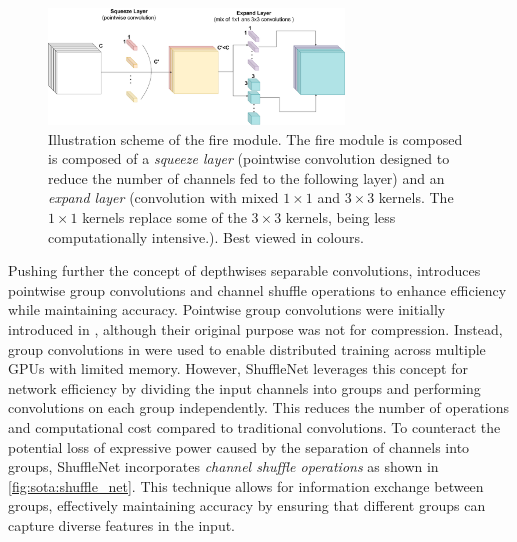 \begin{figure}[htbp]
    \centering
    \includegraphics[width=0.70\textwidth]{chapter_sota/assets/fire_module.pdf}
    \caption{Illustration scheme of the fire module. The fire module is composed
    is composed of a \emph{squeeze layer} (pointwise convolution designed to
    reduce the number of channels fed to the following layer) and an
    \emph{expand layer} (convolution with mixed $1\times1$ and $3\times3$
    kernels. The $1\times1$ kernels replace some of the $3\times3$ kernels,
    being less computationally intensive.). Best viewed in colours.}
    \label{fig:sota:fire_module}
\end{figure}



Pushing further the concept of depthwises separable convolutions,
\cite{ZhangShuffleNet} introduces pointwise group convolutions and channel
shuffle operations to enhance efficiency while maintaining accuracy. Pointwise
group convolutions were initially introduced in
\cite{DBLP:conf/nips/KrizhevskySH12}, although their original purpose was not
for compression. Instead, group convolutions in
\cite{DBLP:conf/nips/KrizhevskySH12} were used to enable distributed training
across multiple \acp{GPU} with limited memory. However, ShuffleNet
\cite{ZhangShuffleNet} leverages this concept for network efficiency by dividing
the input channels into groups and performing convolutions on each group
independently. This reduces the number of operations and computational cost
compared to traditional convolutions. To counteract the potential loss of
expressive power caused by the separation of channels into groups, ShuffleNet
incorporates \emph{channel shuffle operations} as shown in \cref{fig:sota:shuffle_net}. This technique allows for
information exchange between groups, effectively maintaining accuracy by
ensuring that different groups can capture diverse features in the input.\\

